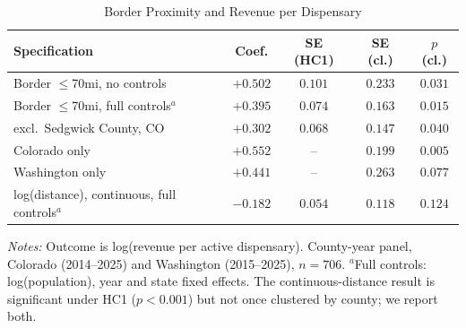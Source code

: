 \begin{table}[htbp]
\centering
\caption{Border Proximity and Revenue per Dispensary}
\label{tab:jrap_border}
\small
\begin{tabular}{p{6.2cm}cccc}
\toprule
Specification & Coef. & SE (HC1) & SE (cl.) & $p$ (cl.) \\
\midrule
Border $\le$70mi, no controls & $+0.502$ & $0.101$ & $0.233$ & $0.031$ \\
Border $\le$70mi, full controls$^{a}$ & $+0.395$ & $0.074$ & $0.163$ & $0.015$ \\
\quad excl.\ Sedgwick County, CO & $+0.302$ & $0.068$ & $0.147$ & $0.040$ \\
Colorado only & $+0.552$ & -- & $0.199$ & $0.005$ \\
Washington only & $+0.441$ & -- & $0.263$ & $0.077$ \\
\midrule
log(distance), continuous, full controls$^{a}$ & $-0.182$ & $0.054$ & $0.118$ & $0.124$ \\
\bottomrule
\end{tabular}
\begin{minipage}{0.95\textwidth}
\vspace{0.3em}
\footnotesize
\textit{Notes:} Outcome is log(revenue per active dispensary). County-year panel, Colorado (2014--2025) and
Washington (2015--2025), $n=706$. $^{a}$Full controls: log(population), year and state fixed effects. The
continuous-distance result is significant under HC1 ($p<0.001$) but not once clustered by county; we report
both.
\end{minipage}
\end{table}
